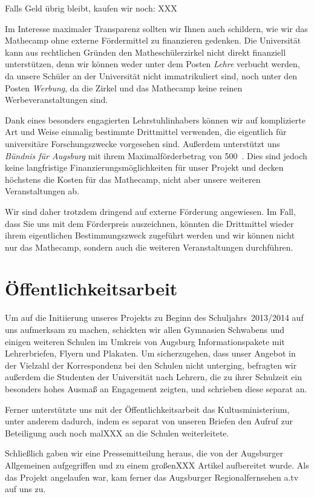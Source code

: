 \documentclass[12pt]{zettel}
\begin{document}
Falls Geld übrig bleibt, kaufen wir noch: XXX

Im Interesse maximaler Transparenz sollten wir Ihnen auch schildern, wie wir
das Mathecamp ohne externe Fördermittel zu finanzieren gedenken. Die
Universität kann aus rechtlichen Gründen den Matheschülerzirkel nicht direkt
finanziell unterstützen, denn wir können weder unter dem Posten \emph{Lehre}
verbucht werden, da unsere Schüler an der Universität nicht immatrikuliert
sind, noch unter den Posten \emph{Werbung}, da die Zirkel und das Mathecamp
keine reinen Werbeveranstaltungen sind.

Dank eines besonders engagierten Lehrstuhlinhabers können wir auf komplizierte
Art und Weise einmalig bestimmte Drittmittel verwenden, die eigentlich für
universitäre Forschungszwecke vorgesehen sind. Außerdem unterstützt uns
\emph{Bündnis für Augsburg} mit ihrem Maximalförderbetrag von 500~\texteuro.
Dies sind jedoch keine langfristige Finanzierungsmöglichkeiten für unser
Projekt und decken höchstens die Kosten für das Mathecamp, nicht aber unsere
weiteren Veranstaltungen ab.

Wir sind daher trotzdem dringend auf externe Förderung angewiesen. Im Fall,
dass Sie uns mit dem Förderpreis auszeichnen, könnten die Drittmittel wieder
ihrem eigentlichen Bestimmungszweck zugeführt werden und wir können nicht nur
das Mathecamp, sondern auch die weiteren Veranstaltungen durchführen.


\section{Öffentlichkeitsarbeit}

Um auf die Initiierung unseres Projekts zu Beginn des Schuljahrs~2013/2014 auf
uns aufmerksam zu machen, schickten wir allen Gymnasien Schwabens und einigen
weiteren Schulen im Umkreis von Augsburg Informationspakete mit Lehrerbriefen,
Flyern und Plakaten. Um sicherzugehen, dass unser Angebot in der
Vielzahl der Korrespondenz bei den Schulen nicht unterging, befragten wir außerdem
die Studenten der Universität nach Lehrern, die zu ihrer Schulzeit ein
besonders hohes Ausmaß an Engagement zeigten, und schrieben diese separat an.

Ferner unterstützte uns mit der Öffentlichkeitsarbeit das Kultusministerium,
unter anderem dadurch, indem es separat von unseren Briefen den Aufruf zur
Beteiligung auch noch malXXX an die Schulen weiterleitete.

Schließlich gaben wir eine Pressemitteilung heraus, die von der
Augsburger Allgemeinen aufgegriffen und zu einem großenXXX Artikel aufbereitet
wurde. Als das Projekt angelaufen war, kam ferner das Augsburger
Regionalfernsehen a.tv auf uns zu.
\end{document}
